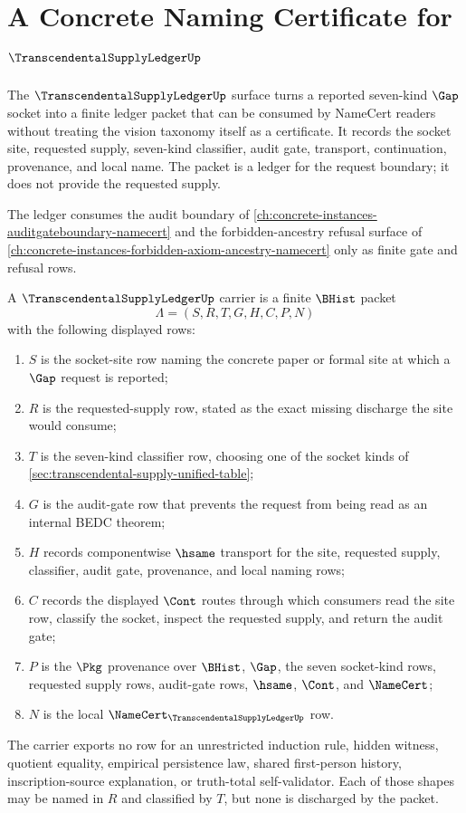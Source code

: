 \chapter{A Concrete Naming Certificate for $\TranscendentalSupplyLedgerUp$}
\label{ch:concrete-instances-transcendental-supply-ledger-namecert}

The $\TranscendentalSupplyLedgerUp$ surface turns a reported seven-kind $\Gap$ socket into a finite ledger packet that can be consumed by NameCert readers without treating the vision taxonomy itself as a certificate. It records the socket site, requested supply, seven-kind classifier, audit gate, transport, continuation, provenance, and local name. The packet is a ledger for the request boundary; it does not provide the requested supply.

The ledger consumes the audit boundary of \autoref{ch:concrete-instances-auditgateboundary-namecert} and the forbidden-ancestry refusal surface of \autoref{ch:concrete-instances-forbidden-axiom-ancestry-namecert} only as finite gate and refusal rows.

\begin{definition}
\label{def:transcendental-supply-ledger-carrier}
A $\TranscendentalSupplyLedgerUp$ carrier is a finite $\BHist$ packet
$$
\Lambda=(S,R,T,G,H,C,P,N)
$$
with the following displayed rows:
\begin{enumerate}
\item $S$ is the socket-site row naming the concrete paper or formal site at which a $\Gap$ request is reported;
\item $R$ is the requested-supply row, stated as the exact missing discharge the site would consume;
\item $T$ is the seven-kind classifier row, choosing one of the socket kinds of \autoref{sec:transcendental-supply-unified-table};
\item $G$ is the audit-gate row that prevents the request from being read as an internal BEDC theorem;
\item $H$ records componentwise $\hsame$ transport for the site, requested supply, classifier, audit gate, provenance, and local naming rows;
\item $C$ records the displayed $\Cont$ routes through which consumers read the site row, classify the socket, inspect the requested supply, and return the audit gate;
\item $P$ is the $\Pkg$ provenance over $\BHist$, $\Gap$, the seven socket-kind rows, requested supply rows, audit-gate rows, $\hsame$, $\Cont$, and $\NameCert$;
\item $N$ is the local $\NameCert_{\TranscendentalSupplyLedgerUp}$ row.
\end{enumerate}
The carrier exports no row for an unrestricted induction rule, hidden witness, quotient equality, empirical persistence law, shared first-person history, inscription-source explanation, or truth-total self-validator. Each of those shapes may be named in $R$ and classified by $T$, but none is discharged by the packet.
\end{definition}

